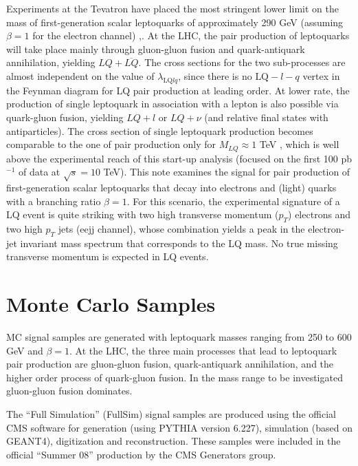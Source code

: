 \documentclass{cmspaper}
\begin{document}
\begin{linenumbers}
Experiments at the Tevatron have placed the most stringent lower limit on the mass of first-generation scalar 
leptoquarks of approximately 290 GeV (assuming $\beta=1$ for the electron channel) \cite{d02008},\cite{cdf2005}.
At the LHC, the pair production of leptoquarks will take place mainly through gluon-gluon fusion and 
quark-antiquark annihilation, yielding $LQ + \overline{LQ}$. 
The cross sections for the two sub-processes are almost independent on the value of 
$\lambda_{\mbox{LQ}lq}$, since there is no $\mbox{LQ}-l-q$ vertex in the Feynman diagram for LQ pair production 
at leading order. At lower rate, the production of single leptoquark in association with a lepton is also possible via quark-gluon 
fusion, yielding $LQ+ l$ or $LQ+ \nu$ (and relative final states with antiparticles). The cross section of single leptoquark production
becomes comparable to the one of pair production only for $M_{LQ}\approx 1$ TeV \cite{LQSingleAndPairProd}, 
which is well above the experimental reach of this start-up analysis (focused on the first 100 pb$^{-1}$ of data at $\sqrt{s}=10$ TeV).  
This note examines the signal for pair production of first-generation scalar leptoquarks that decay into electrons and 
(light) quarks with a branching ratio $\beta=1$. 
For this scenario, the experimental signature of a LQ event is quite striking with two 
high transverse momentum ($p_T$) electrons and two high $p_T$ jets (eejj channel), 
whose combination yields a peak in the electron-jet invariant mass 
spectrum that corresponds to the LQ mass. No true missing transverse momentum is expected in LQ events.


\section{Monte Carlo Samples} \label{sec:MCSamples}
MC signal samples are generated with leptoquark masses ranging from 250 to 600 GeV and $\beta=1$. 
At the LHC, the three main processes that lead to leptoquark pair production are gluon-gluon fusion, 
quark-antiquark annihilation, and the higher order process of quark-gluon fusion. In the mass range to be investigated gluon-gluon fusion dominates. 

The ``Full Simulation'' (FullSim) signal samples are produced using 
the official CMS software for generation (using PYTHIA version 6.227), 
simulation (based on GEANT4), digitization and reconstruction. 
These samples were included in the official ``Summer 08'' production by the CMS Generators group.


\end{linenumbers}
\end{document}
